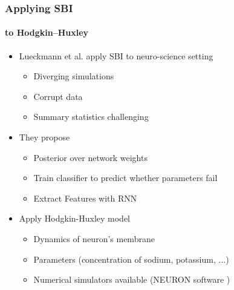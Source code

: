 \documentclass[9pt]{beamer}
\begin{document}
\begin{frame}
\frametitle{Applying SBI}
\framesubtitle{to Hodgkin–Huxley}
\begin{itemize}
	\item Lueckmann et al. \cite{lueckmann2017flexible} apply SBI to neuro-science setting
	\begin{itemize}
		\item Diverging simulations
		\item Corrupt data
		\item Summary statistics challenging
	\end{itemize}
	\item They propose
	\begin{itemize}
			\item Posterior over network weights%
			\item Train classifier to predict whether parameters fail
		\item Extract Features with RNN
	\end{itemize}
		\item Apply Hodgkin-Huxley model \cite{hodgkin1952quantitative} 
\begin{itemize}
	\item Dynamics of neuron's membrane
	\item Parameters (concentration of sodium, potassium, ...)
	\item Numerical simulators available (NEURON software \cite{carnevale2006neuron})
\end{itemize}
\end{itemize}
\end{frame}  
%
\end{document}
